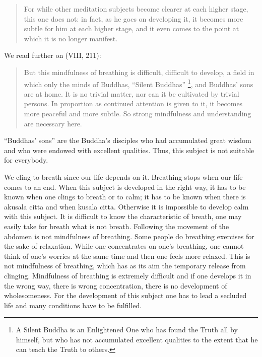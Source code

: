 \documentclass{book}
\begin{document}
\begin{quote}
For while other meditation subjects become clearer at each higher stage,
this one does not: in fact, as he goes on developing it, it becomes more
subtle for him at each higher stage, and it even comes to the point at
which it is no longer manifest.
\end{quote}

We read further on (VIII, 211):

\begin{quote}
But this mindfulness of breathing is difficult, difficult to develop, a
field in which only the minds of Buddhas, ``Silent Buddhas'' \footnote{A
  Silent Buddha is an Enlightened One who has found the Truth all by
  himself, but who has not accumulated excellent qualities to the extent
  that he can teach the Truth to others.}, and Buddhas' sons are at
home. It is no trivial matter, nor can it be cultivated by trivial
persons. In proportion as continued attention is given to it, it becomes
more peaceful and more subtle. So strong mindfulness and understanding
are necessary here.
\end{quote}

``Buddhas' sons'' are the Buddha's disciples who had accumulated great
wisdom and who were endowed with excellent qualities. Thus, this subject
is not suitable for everybody.

We cling to breath since our life depends on it. Breathing stops when
our life comes to an end. When this subject is developed in the right
way, it has to be known when one clings to breath or to calm; it
has to be known when there is akusala citta and when kusala citta.
Otherwise it is impossible to develop calm with this subject. It is
difficult to know the characteristic of breath, one may easily take for
breath what is not breath. Following the movement of the abdomen is not
mindfulness of breathing. Some people do breathing exercises for the
sake of relaxation. While one concentrates on one's breathing, one
cannot think of one's worries at the same time and then one feels more
relaxed. This is not mindfulness of breathing, which has as its aim the
temporary release from clinging. Mindfulness of breathing is extremely
difficult and if one develops it in the wrong way, there is wrong
concentration, there is no development of wholesomeness. For the
development of this subject one has to lead a secluded life and many
conditions have to be fulfilled.
\end{document}
